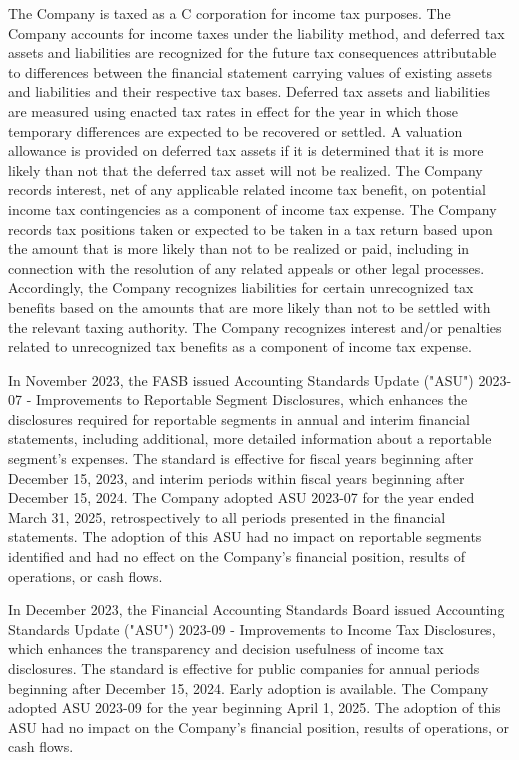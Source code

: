 \documentclass[11pt,a4paper]{article}
\begin{document}
The Company is taxed as a C corporation for income tax purposes. The Company accounts for income taxes under the liability method, and deferred tax assets and liabilities are recognized for the future tax consequences attributable to differences between the financial statement carrying values of existing assets and liabilities and their respective tax bases. Deferred tax assets and liabilities are measured using enacted tax rates in effect for the year in which those temporary differences are expected to be recovered or settled. A valuation allowance is provided on deferred tax assets if it is determined that it is more likely than not that the deferred tax asset will not be realized. The Company records interest, net of any applicable related income tax benefit, on potential income tax contingencies as a component of income tax expense. The Company records tax positions taken or expected to be taken in a tax return based upon the amount that is more likely than not to be realized or paid, including in connection with the resolution of any related appeals or other legal processes. Accordingly, the Company recognizes liabilities for certain unrecognized tax benefits based on the amounts that are more likely than not to be settled with the relevant taxing authority. The Company recognizes interest and/or penalties related to unrecognized tax benefits as a component of income tax expense.

In November 2023, the FASB issued Accounting Standards Update ("ASU") 2023-07 - Improvements to Reportable Segment Disclosures, which enhances the disclosures required for reportable segments in annual and interim financial statements, including additional, more detailed information about a reportable segment's expenses. The standard is effective for fiscal years beginning after December 15, 2023, and interim periods within fiscal years beginning after December 15, 2024. The Company adopted ASU 2023-07 for the year ended March 31, 2025, retrospectively to all periods presented in the financial statements. The adoption of this ASU had no impact on reportable segments identified and had no effect on the Company's financial position, results of operations, or cash flows.

In December 2023, the Financial Accounting Standards Board issued Accounting Standards Update ("ASU") 2023-09 - Improvements to Income Tax Disclosures, which enhances the transparency and decision usefulness of income tax disclosures. The standard is effective for public companies for annual periods beginning after December 15, 2024. Early adoption is available. The Company adopted ASU 2023-09 for the year beginning April 1, 2025. The adoption of this ASU had no impact on the Company's financial position, results of operations, or cash flows.
\end{document}
